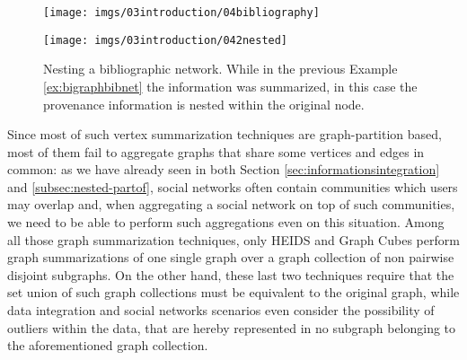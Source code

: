 \begin{figure}[!t]
	\centering
	\begin{minipage}[!t]{0.6\textwidth}
		\centering
		\texttt{[image: imgs/03introduction/04bibliography]}
		\label{fig:inputbibex2}
	\end{minipage}
\medskip

	\begin{minipage}[!t]{\textwidth}
		\centering
		\texttt{[image: imgs/03introduction/042nested]}
		\label{fig:outputnested}
	\end{minipage}
	\caption{Nesting a bibliographic network. While in the previous Example \vref{ex:bigraphbibnet} the information was summarized, in this case the provenance information is nested within the original node. }
	\label{fig:bibex2}
\end{figure}
Since most of such vertex summarization techniques are graph-partition based, most of them fail to aggregate graphs that share some vertices and edges in common: as we have already seen in both Section \vref{sec:informationsintegration} and \vref{subsec:nested-partof}, social networks often contain communities which users may overlap and, when aggregating a social network on top of such communities, we need to be able to perform such aggregations even on this situation. Among all those graph summarization techniques, only HEIDS \cite{ChengJQ16} and Graph Cubes \cite{Zhao11} perform graph summarizations of one single graph over a graph collection of non pairwise disjoint subgraphs. On the other hand, these last two techniques require that the set union of such graph collections must be equivalent to the original graph, while data integration and social networks scenarios even consider the possibility of outliers within the data, that are hereby represented in no subgraph belonging to the aforementioned graph collection. %
